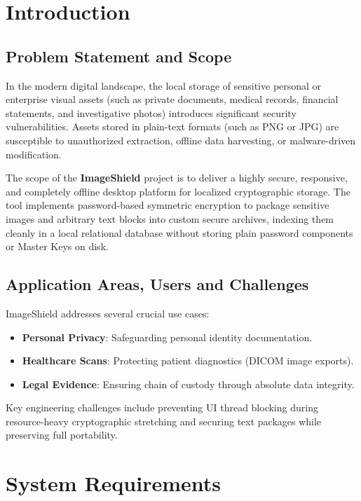 \documentclass[12pt,a4paper]{report}
\begin{document}
\chapter{Introduction}

\section{Problem Statement and Scope}
In the modern digital landscape, the local storage of sensitive personal or enterprise visual assets (such as private documents, medical records, financial statements, and investigative photos) introduces significant security vulnerabilities. Assets stored in plain-text formats (such as PNG or JPG) are susceptible to unauthorized extraction, offline data harvesting, or malware-driven modification. 
\par
The scope of the \textbf{ImageShield} project is to deliver a highly secure, responsive, and completely offline desktop platform for localized cryptographic storage. The tool implements password-based symmetric encryption to package sensitive images and arbitrary text blocks into custom secure archives, indexing them cleanly in a local relational database without storing plain password components or Master Keys on disk.

\section{Application Areas, Users and Challenges}
ImageShield addresses several crucial use cases:
\begin{itemize}
    \item \textbf{Personal Privacy}: Safeguarding personal identity documentation.
    \item \textbf{Healthcare Scans}: Protecting patient diagnostics (DICOM image exports).
    \item \textbf{Legal Evidence}: Ensuring chain of custody through absolute data integrity.
\end{itemize}
Key engineering challenges include preventing UI thread blocking during resource-heavy cryptographic stretching and securing text packages while preserving full portability.

\chapter{System Requirements}
\end{document}
